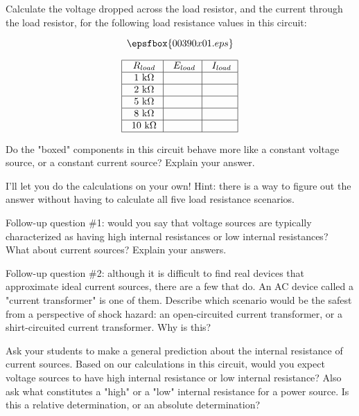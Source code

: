 

Calculate the voltage dropped across the load resistor, and the current through the load resistor, for the following load resistance values in this circuit:

$$\epsfbox{00390x01.eps}$$

$$\vbox{\offinterlineskip
\halign{\strut
\vrule \quad\hfil $#$ \ \hfil & 
\vrule \quad\hfil $#$ \ \hfil & 
\vrule \quad\hfil $#$ \ \hfil \vrule \cr
\noalign{\hrule}
%
R_{load} & E_{load} & I_{load} \cr
\noalign{\hrule}
%
\hbox{1 k} \Omega &  &  \cr
\noalign{\hrule}
%
\hbox{2 k} \Omega &  &  \cr
\noalign{\hrule}
%
\hbox{5 k} \Omega &  &  \cr
\noalign{\hrule}
%
\hbox{8 k} \Omega &  &  \cr
\noalign{\hrule}
%
\hbox{10 k} \Omega &  &  \cr
\noalign{\hrule}
%
} %
}$$ %

Do the "boxed" components in this circuit behave more like a constant voltage source, or a constant current source?  Explain your answer.







I'll let you do the calculations on your own!  Hint: there is a way to figure out the answer without having to calculate all five load resistance scenarios.

\vskip 10pt

Follow-up question \#1: would you say that voltage sources are typically characterized as having high internal resistances or low internal resistances?  What about current sources?  Explain your answers.

\vskip 10pt

Follow-up question \#2: although it is difficult to find real devices that approximate ideal current sources, there are a few that do.  An AC device called a "current transformer" is one of them.  Describe which scenario would be the safest from a perspective of shock hazard: an open-circuited current transformer, or a shirt-circuited current transformer.  Why is this?







Ask your students to make a general prediction about the internal resistance of current sources.  Based on our calculations in this circuit, would you expect voltage sources to have high internal resistance or low internal resistance?  Also ask what constitutes a "high" or a "low" internal resistance for a power source.  Is this a relative determination, or an absolute determination?




